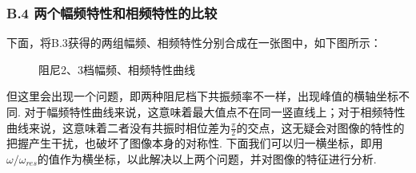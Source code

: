 \documentclass[UTF8]{ctexart}
\begin{document}
\subsubsection*{B.4 两个幅频特性和相频特性的比较}
下面，将B.3获得的两组幅频、相频特性分别合成在一张图中，如下图所示：
\begin{figure}[H]\centering
{
\hspace{-25mm}
\hspace{-15mm}
\caption{阻尼2、3档幅频、相频特性曲线}
\restoregeometry
}
\end{figure}
但这里会出现一个问题，即两种阻尼档下共振频率不一样，出现峰值的横轴坐标不同. 对于幅频特性曲线来说，这意味着最大值点不在同一竖直线上；对于相频特性曲线来说，这意味着二者没有共振时相位差为$\frac{\pi}{2}$的交点，这无疑会对图像的特性的把握产生干扰，也破坏了图像本身的对称性. 下面我们可以归一横坐标，即用$\omega/\omega_{res}$的值作为横坐标，以此解决以上两个问题，并对图像的特征进行分析.
\end{document}
